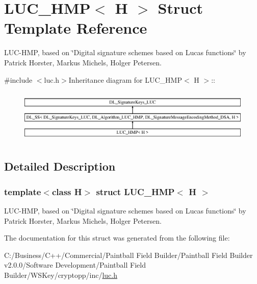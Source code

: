 \hypertarget{struct_l_u_c___h_m_p}{
\section{LUC\_\-HMP$<$ H $>$ Struct Template Reference}
\label{struct_l_u_c___h_m_p}
}


LUC-\/HMP, based on \char`\"{}Digital signature schemes based on Lucas functions\char`\"{} by Patrick Horster, Markus Michels, Holger Petersen.  


{\ttfamily \#include $<$luc.h$>$}Inheritance diagram for LUC\_\-HMP$<$ H $>$::\begin{figure}[H]
\begin{center}
\leavevmode
\includegraphics[height=2.57274cm]{struct_l_u_c___h_m_p}
\end{center}
\end{figure}


\subsection{Detailed Description}
\subsubsection*{template$<$class H$>$ struct LUC\_\-HMP$<$ H $>$}

LUC-\/HMP, based on \char`\"{}Digital signature schemes based on Lucas functions\char`\"{} by Patrick Horster, Markus Michels, Holger Petersen. 

The documentation for this struct was generated from the following file:\begin{DoxyCompactItemize}
\item 
C:/Business/C++/Commercial/Paintball Field Builder/Paintball Field Builder v2.0.0/Software Development/Paintball Field Builder/WSKey/cryptopp/inc/\hyperlink{luc_8h}{luc.h}\end{DoxyCompactItemize}
